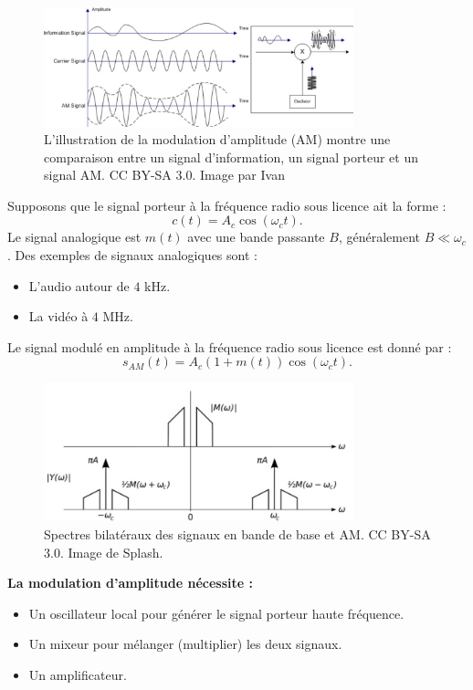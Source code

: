 \begin{figure}[H] %
    \centering
    \includegraphics[width=0.8\textwidth]{figures/6-32.jpg}
    \caption{L'illustration de la modulation d'amplitude (AM) montre une comparaison entre un signal d'information, un signal porteur et un signal AM. CC BY-SA 3.0. Image par Ivan }
    \label{fig:communication2}
\end{figure}
Supposons que le signal porteur à la fréquence radio sous licence ait la forme :  
\[
c(t) = A_c \cos(\omega_c t).
\]
Le signal analogique est $m(t)$ avec une bande passante $B$, généralement $B \ll \omega_c$.  
Des exemples de signaux analogiques sont :
\begin{itemize}
    \item L'audio autour de $4$ kHz.
    \item La vidéo à $4$ MHz.
\end{itemize}
Le signal modulé en amplitude à la fréquence radio sous licence est donné par :
\[
s_{AM} (t) = A_c (1 + m(t)) \cos(\omega_c t).
\]
\begin{figure}[H] %
    \centering
    \includegraphics[width=0.8\textwidth]{figures/6-121.jpg}
  \caption{Spectres bilatéraux des signaux en bande de base et AM. CC BY-SA 3.0. Image de Splash. }
    \label{fig:communication2}
\end{figure}
\textbf{La modulation d'amplitude nécessite :}
\begin{itemize}
    \item Un oscillateur local pour générer le signal porteur haute fréquence.
    \item Un mixeur pour mélanger (multiplier) les deux signaux.
    \item Un amplificateur.
\end{itemize}
